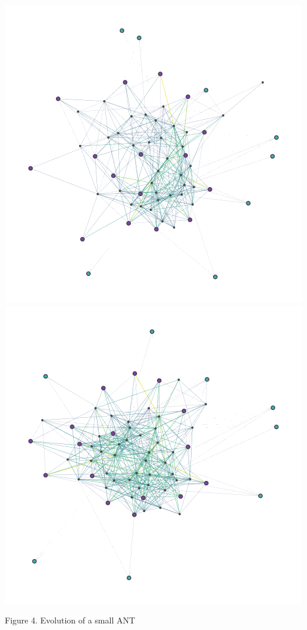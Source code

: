 \documentclass{article}
\begin{document}
\begin{multicols}{2}
\begin{center}
	\includegraphics[scale=0.23]{figs/evolution-18}
	\includegraphics[scale=0.23]{figs/evolution-26}
	
		{\small Figure 4. Evolution of a small ANT}
	

\end{center}
\end{multicols}
\end{document}

